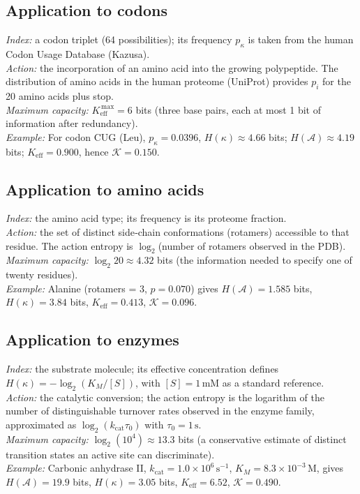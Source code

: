 \documentclass[12pt,a4paper]{article}
\newcommand{\REL}{\mathcal{K}}          %
\newcommand{\ABS}{K_{\mathrm{eff}}}     %
\begin{document}
	\subsection{Application to codons}
	\textit{Index:} a codon triplet (64 possibilities); its frequency \(p_\kappa\) is taken from the human Codon Usage Database (Kazusa). \\
	\textit{Action:} the incorporation of an amino acid into the growing polypeptide. The distribution of amino acids in the human proteome (UniProt) provides \(p_i\) for the 20 amino acids plus stop. \\
	\textit{Maximum capacity:} \(\ABS^{\,\max}=6\) bits (three base pairs, each at most 1 bit of information after redundancy). \\
	\textit{Example:} For codon CUG (Leu), \(p_\kappa=0.0396\), \(H(\kappa)\approx4.66\) bits; \(H(\mathcal{A})\approx4.19\) bits; \(\ABS=0.900\), hence \(\REL=0.150\).
	
	\subsection{Application to amino acids}
	\textit{Index:} the amino acid type; its frequency is its proteome fraction. \\
	\textit{Action:} the set of distinct side‑chain conformations (rotamers) accessible to that residue. The action entropy is \(\log_2\)(number of rotamers observed in the PDB). \\
	\textit{Maximum capacity:} \(\log_2 20 \approx 4.32\) bits (the information needed to specify one of twenty residues). \\
	\textit{Example:} Alanine (rotamers = 3, \(p=0.070\)) gives \(H(\mathcal{A})=1.585\) bits, \(H(\kappa)=3.84\) bits, \(\ABS=0.413\), \(\REL=0.096\).
	
	\subsection{Application to enzymes}
	\textit{Index:} the substrate molecule; its effective concentration defines \(H(\kappa) = -\log_2(K_M/[S])\), with \([S]=1\,\text{mM}\) as a standard reference. \\
	\textit{Action:} the catalytic conversion; the action entropy is the logarithm of the number of distinguishable turnover rates observed in the enzyme family, approximated as \(\log_2(k_{\mathrm{cat}}\tau_0)\) with \(\tau_0=1\,\text{s}\). \\
	\textit{Maximum capacity:} \(\log_2(10^4)\approx13.3\) bits (a conservative estimate of distinct transition states an active site can discriminate). \\
	\textit{Example:} Carbonic anhydrase II, \(k_{\mathrm{cat}}=1.0\times10^6\,\text{s}^{-1}\), \(K_M=8.3\times10^{-3}\,\text{M}\), gives \(H(\mathcal{A})=19.9\) bits, \(H(\kappa)=3.05\) bits, \(\ABS=6.52\), \(\REL=0.490\).
	
\end{document}
